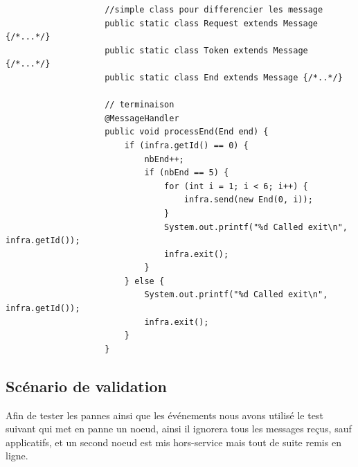 \documentclass{article}
\begin{document}
\begin{lstlisting}
					//simple class pour differencier les message
					public static class Request extends Message {/*...*/}				
					public static class Token extends Message {/*...*/}
					public static class End extends Message {/*..*/}
				
					// terminaison
					@MessageHandler
					public void processEnd(End end) {
						if (infra.getId() == 0) {
							nbEnd++;
							if (nbEnd == 5) {
								for (int i = 1; i < 6; i++) {
									infra.send(new End(0, i));
								}
								System.out.printf("%d Called exit\n", infra.getId());
								infra.exit();
							}
						} else {
							System.out.printf("%d Called exit\n", infra.getId());
							infra.exit();
						}
					}	
			\end{lstlisting}
			
			\subsection{Scénario de validation}
			Afin de tester les pannes ainsi que les événements nous avons utilisé le test suivant qui met en panne un noeud, ainsi il ignorera tous les messages reçus, sauf applicatifs, et un second noeud est mis hors-service mais tout de suite remis en ligne.
\end{document}
